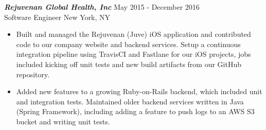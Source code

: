{\sl \textbf{Rejuvenan Global Health, Inc}} \hfill May 2015 - December 2016 \\
Software Engineer \hfill New York, NY
\begin{itemize}
\item Built and managed the Rejuvenan (Juve) iOS application and contributed code to our company website and backend services. Setup a continuous integration pipeline using TravisCI and Fastlane for our iOS projects, jobs included kicking off unit tests and new build artifacts from our GitHub repository.
\item Added new features to a growing Ruby-on-Rails backend, which included unit and integration tests. Maintained older backend services written in Java (Spring Framework), including adding a feature to push logs to an AWS S3 bucket and writing unit tests.
\end{itemize}
